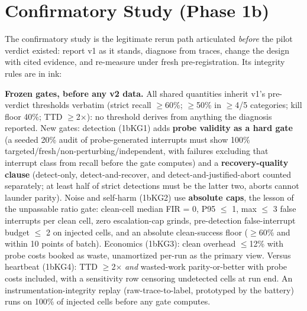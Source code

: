 \documentclass[acmsmall,screen,review,anonymous]{acmart}
\begin{document}
\section{Confirmatory Study (Phase 1b)}
The confirmatory study is the legitimate rerun path articulated \emph{before} the pilot verdict existed: report v1 as it stands, diagnose from traces, change the design with cited evidence, and re-measure under fresh pre-registration. Its integrity rules are in ink:

\textbf{Frozen gates, before any v2 data.} All shared quantities inherit v1's pre-verdict thresholds verbatim (strict recall $\ge$60\%; $\ge$50\% in $\ge$4/5 categories; kill floor 40\%; TTD $\ge$2$\times$): no threshold derives from anything the diagnosis reported. New gates: detection (1bKG1) adds \textbf{probe validity as a hard gate} (a seeded 20\% audit of probe-generated interrupts must show 100\% targeted/fresh/non-perturbing/independent, with failures excluding that interrupt class from recall before the gate computes) and a \textbf{recovery-quality clause} (detect-only, detect-and-recover, and detect-and-justified-abort counted separately; at least half of strict detections must be the latter two, aborts cannot launder parity). Noise and self-harm (1bKG2) use \textbf{absolute caps}, the lesson of the unpassable ratio gate: clean-cell median FIR = 0, P95 $\le$ 1, max $\le$ 3 false interrupts per clean cell, zero escalation-cap grinds, pre-detection false-interrupt budget $\le$ 2 on injected cells, and an absolute clean-success floor ($\ge$60\% and within 10 points of batch). Economics (1bKG3): clean overhead $\le$12\% with probe costs booked as waste, unamortized per-run as the primary view. Versus heartbeat (1bKG4): TTD $\ge$2$\times$ \emph{and} wasted-work parity-or-better with probe costs included, with a sensitivity row censoring undetected cells at run end. An instrumentation-integrity replay (raw-trace-to-label, prototyped by the battery) runs on 100\% of injected cells before any gate computes.
\end{document}
